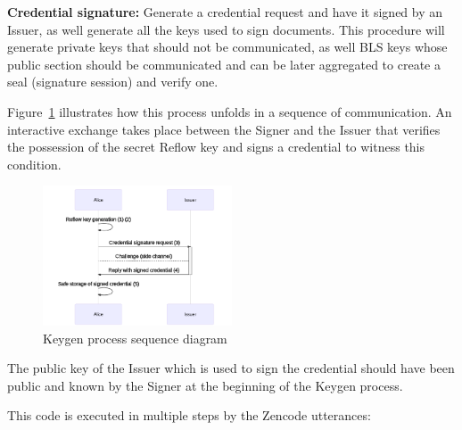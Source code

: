 \documentclass[twocolumn]{article}
\begin{document}
\textbf{Credential signature:} Generate a credential request and have
it signed by an Issuer, as well generate all the keys used to sign
documents. This procedure will generate private keys that should not
be communicated, as well BLS keys whose public section should be
communicated and can be later aggregated to create a seal (signature
session) and verify one.

Figure~\ref{fig:keygen} illustrates how this process unfolds in a
sequence of communication. An interactive exchange takes place between
the Signer and the Issuer that verifies the possession of the secret
Reflow key and signs a credential to witness this condition.

\begin{figure}
  \caption{Keygen process sequence diagram}
  \label{fig:keygen}
  \centering
  \includegraphics[width=0.5\textwidth]{keygen-seq.png}
\end{figure}

The public key of the Issuer which is used to sign the credential
should have been public and known by the Signer at the beginning of
the Keygen process.

This code is executed in multiple steps by the Zencode utterances:
\end{document}
